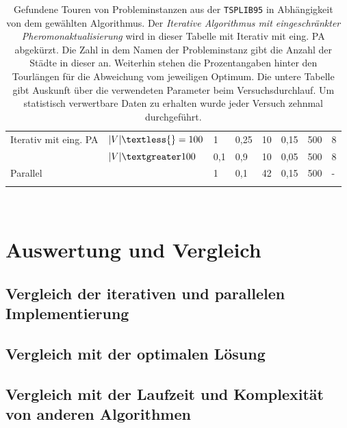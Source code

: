\documentclass[doktyp=barbeit, sprache=german]{TUBAFarbeiten}
\begin{document}
\begin{landscape}
\begin{table}[]
{\begin{tabular}{ll|llllll}
Iterativ mit eing. PA & $|V| \textless{}= 100$ & 1     & 0,25 & 10                    & 0,15                      & 500               & 8                                                                                                 \\
                      & $|V| \textgreater 100$ & 0,1   & 0,9  & 10                    & 0,05                      & 500               & 8                                                                                                 \\ \hline
Parallel              &                      & 1     & 0,1  & 42                    & 0,15                      & 500               & -                                                                                                 \\ \bottomrule
\multicolumn{8}{l}{}  \\ 
\end{tabular}%
}
\\\caption{Gefundene Touren von Probleminstanzen aus der \texttt{TSPLIB95} in Abhängigkeit von dem gewählten Algorithmus. Der \textit{Iterative Algorithmus mit eingeschränkter Pheromonaktualisierung} wird in dieser Tabelle mit \glqq Iterativ mit eing. PA\grqq{} abgekürzt. Die Zahl in dem Namen der Probleminstanz gibt die Anzahl der Städte in dieser an. Weiterhin stehen die Prozentangaben hinter den Tourlängen für die Abweichung vom jeweiligen Optimum. Die untere Tabelle gibt Auskunft über die verwendeten Parameter beim Versuchsdurchlauf. Um statistisch verwertbare Daten zu erhalten wurde jeder Versuch zehnmal durchgeführt.}
\label{table1}
\end{table}
\end{landscape}
\section{Auswertung und Vergleich}
\subsection{Vergleich der iterativen und parallelen Implementierung}
\subsection{Vergleich mit der optimalen Lösung}
\subsection{Vergleich mit der Laufzeit und Komplexität von anderen Algorithmen}
\end{document}
